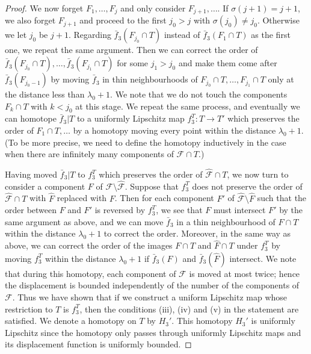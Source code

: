\documentclass{amsart}
\theoremstyle{definition}
\numberwithin{figure}{section}
\numberwithin{equation}{section}
\begin{document}
\begin{proof}
We now forget $F_1, \dots , F_j$ and only consider $F_{j+1}, \dots $.
If $\sigma(j+1)=j+1$, we also forget $F_{j+1}$ and proceed to the first $j_0 >j$ with $\sigma(j_0) \neq j_0$.
Otherwise we let $j_0$ be $j+1$.
Regarding $\bar f_3(F_{j_0} \cap T)$ instead of $\bar f_3(F_1 \cap T)$ as the first one, we repeat the same argument.
Then we can correct the order of $\bar f_3(F_{j_0} \cap T), \dots , \bar f_3(F_{j_1}\cap T)$ for some $j_1 > j_0$ and make them come after $\bar f_3(F_{j_0-1})$ by moving $\bar f_3$ in thin neighbourhoods of $F_{j_0} \cap T, \dots , F_{j_1} \cap T$ only at the distance less than $\lambda_0+1$.
We note that we do not touch the components $F_k \cap T$ with $k < j_0$ at this stage.
We repeat the same process, and eventually we can homotope $\bar f_3|T$ to a uniformly Lipschitz map $f_3^T: T \rightarrow T'$ which preserves the order of $F_1 \cap T, \dots$ by a homotopy moving every point within the distance $\lambda_0+1$.
(To be more precise, we need to define the homotopy inductively in the case when there are infinitely many components of $\mathcal F \cap T$.)

Having moved $\bar f_3|T$ to $f_3^T$ which preserves the order of $\hat{\mathcal F} \cap T$, we now turn to consider a component $F$ of $\mathcal F \setminus \hat{\mathcal F}$.
Suppose that  $f_3^T$ does not preserve the order of $\hat{\mathcal F} \cap T$ with $\hat F$ replaced with $F$.
Then for each component $F'$ of $\hat{\mathcal F} \setminus \hat F$ such that the order between $F$ and $F'$ is reversed by $f_3^T$, we see that $F$ must intersect $F'$ by the same argument as above, and we can move $\bar f_3$ in a thin neighbourhood of $F \cap T$ within the distance $\lambda_0+1$ to correct the order.
Moreover, in the same way as above, we can correct the order of the images $F\cap T$ and $\hat F \cap T$ under $f_3^T$ by moving $f_3^T$ within the distance $\lambda_0+1$ if $\bar f_3(F)$ and $\bar f_3(\hat F)$ intersect.
We note that during this homotopy, each component of $\mathcal F$ is moved at most twice; hence the displacement is bounded independently of the number of the components of $\mathcal F$.
Thus we have shown that if we construct a uniform Lipschitz map whose restriction to $T$ is $f_3^T$, then the conditions (iii), (iv) and (v) in the statement are satisfied.
We denote  a homotopy on $T$ by $H_3'$.
This homotopy $H_3'$ is uniformly Lipschitz since the homotopy only passes through uniformly Lipschitz maps and its displacement function is uniformly bounded.




\end{proof}
\end{document}
